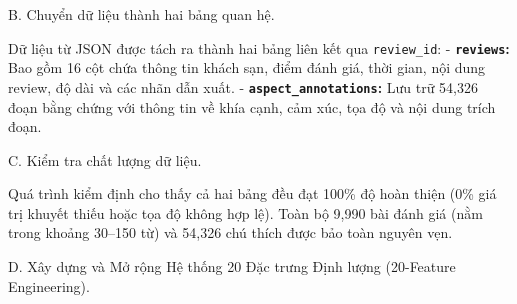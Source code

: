 \documentclass[pdflatex,sn-mathphys-num]{sn-jnl}
\theoremstyle{thmstyleone}
\theoremstyle{thmstyletwo}
\theoremstyle{thmstylethree}
\begin{document}
B. Chuyển dữ liệu thành hai bảng quan hệ.

Dữ liệu từ JSON được tách ra thành hai bảng liên kết qua \texttt{review\_id}:
- \textbf{\texttt{reviews}:} Bao gồm 16 cột chứa thông tin khách sạn, điểm đánh giá, thời gian, nội dung review, độ dài và các nhãn dẫn xuất.
- \textbf{\texttt{aspect\_annotations}:} Lưu trữ 54,326 đoạn bằng chứng với thông tin về khía cạnh, cảm xúc, tọa độ và nội dung trích đoạn.

C. Kiểm tra chất lượng dữ liệu.

Quá trình kiểm định cho thấy cả hai bảng đều đạt 100\% độ hoàn thiện (0\% giá trị khuyết thiếu hoặc tọa độ không hợp lệ). Toàn bộ 9,990 bài đánh giá (nằm trong khoảng 30--150 từ) và 54,326 chú thích được bảo toàn nguyên vẹn.

D. Xây dựng và Mở rộng Hệ thống 20 Đặc trưng Định lượng (20-Feature Engineering).
\end{document}
